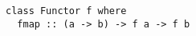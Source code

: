 \begin{algorithm}

\begin{verbatim}
class Functor f where
  fmap :: (a -> b) -> f a -> f b
\end{verbatim}

\caption{Functor type class in Haskell. %
\label{functor:haskell}}
\end{algorithm}
